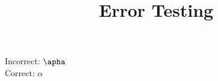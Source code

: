\documentclass[12pt]{amsart}
\begin{document}
\title{Error Testing}
\maketitle

\noindent Incorrect: $\apha$\\
\noindent Correct: $\alpha$
\end{document}
